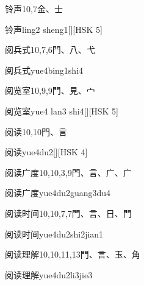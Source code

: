 \begin{entry}{铃声}{10,7}{⾦、⼠}
  \begin{phonetics}{铃声}{ling2 sheng1}[][HSK 5]
  \end{phonetics}
\end{entry}

\begin{entry}{阅兵式}{10,7,6}{⾨、⼋、⼷}
  \begin{phonetics}{阅兵式}{yue4bing1shi4}
  \end{phonetics}
\end{entry}

\begin{entry}{阅览室}{10,9,9}{⾨、⾒、⼧}
  \begin{phonetics}{阅览室}{yue4 lan3 shi4}[][HSK 5]
  \end{phonetics}
\end{entry}

\begin{entry}{阅读}{10,10}{⾨、⾔}
  \begin{phonetics}{阅读}{yue4du2}[][HSK 4]
  \end{phonetics}
\end{entry}

\begin{entry}{阅读广度}{10,10,3,9}{⾨、⾔、⼴、⼴}
  \begin{phonetics}{阅读广度}{yue4du2guang3du4}
  \end{phonetics}
\end{entry}

\begin{entry}{阅读时间}{10,10,7,7}{⾨、⾔、⽇、⾨}
  \begin{phonetics}{阅读时间}{yue4du2shi2jian1}
  \end{phonetics}
\end{entry}

\begin{entry}{阅读理解}{10,10,11,13}{⾨、⾔、⽟、⾓}
  \begin{phonetics}{阅读理解}{yue4du2li3jie3}
  \end{phonetics}
\end{entry}

